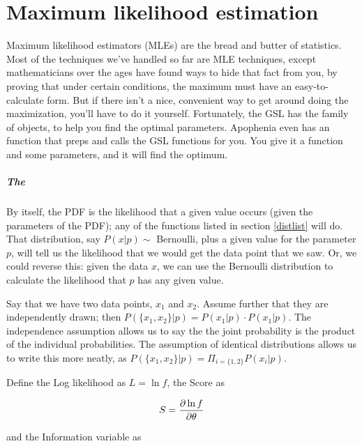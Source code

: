 \chapter{Maximum likelihood estimation} \label{mle}

Maximum likelihood estimators (MLEs) are the bread and butter of
statistics. Most of the techniques we've handled so far are MLE
techniques, except mathematicians over the ages have found ways to hide
that fact from you, by proving that under certain conditions, the
maximum must have an easy-to-calculate form. But if there isn't a nice,
convenient way to get around doing the maximization, you'll have to do
it yourself. Fortunately, the GSL has the  family
of objects, to help you find the optimal parameters. Apophenia even
has an  function that preps and calls
the GSL functions for you. You give it a function and some parameters,
and it will find the optimum.

\paragraph{The }	\label{the score}
By itself, the PDF is the likelihood that a given value occurs (given
the parameters of the PDF); any of the functions listed in section
\ref{distlist} will do. That distribution, say $P(x|p)\sim$ Bernoulli,
plus a given value for the parameter $p$, will tell us the likelihood
that we would get the data point that we saw. Or, we could reverse this:
given the data $x$, we can use the Bernoulli distribution to calculate the
likelihood that $p$ has any given value.

Say that we have two data points, $x_1$ and $x_2$. Assume further that
they are independently drawn; then $P(\{x_1,x_2\}|p)=P(x_1|p)\cdot P(x_1|p)$. 
The independence assumption allows us to say the the joint probability
is the product of the individual probabilities. The assumption of
identical distributions allows us to write this more neatly, as 
$P(\{x_1,x_2\}|p)=\Pi_{i=\{1,2\}}P(x_i|p)$.

Define the Log likelihood as $L=\ln f$, the Score as

$$S={\partial \ln f\over \partial \theta}$$ 

and the Information variable as

